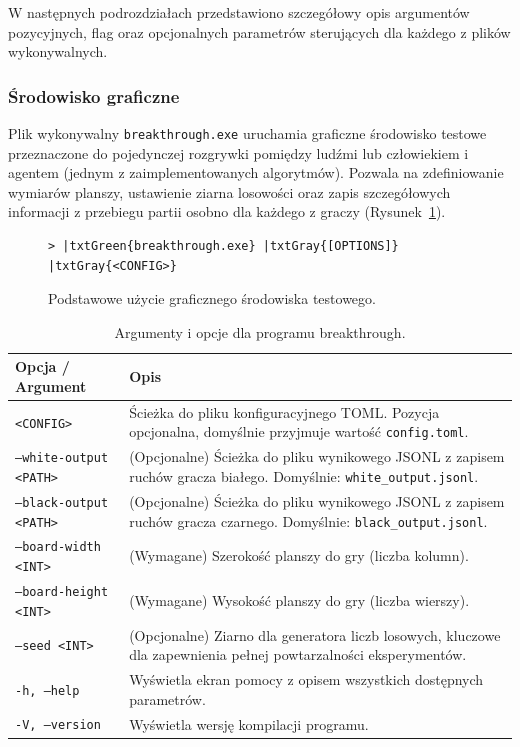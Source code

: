 \documentclass{article}
\begin{document}
W następnych podrozdziałach przedstawiono szczegółowy opis argumentów pozycyjnych, flag oraz opcjonalnych parametrów sterujących dla każdego z plików wykonywalnych.

\subsubsection{Środowisko graficzne}

Plik wykonywalny \texttt{breakthrough.exe} uruchamia graficzne środowisko testowe przeznaczone do pojedynczej rozgrywki pomiędzy ludźmi lub człowiekiem i agentem (jednym z zaimplementowanych algorytmów). Pozwala na zdefiniowanie wymiarów planszy, ustawienie ziarna losowości oraz zapis szczegółowych informacji z przebiegu partii osobno dla każdego z graczy (Rysunek~\ref{fig:breakthrough-run}).

\begin{figure}[H]
\small
\centering
\begin{Verbatim}[commandchars=\|\{\}]
> |txtGreen{breakthrough.exe} |txtGray{[OPTIONS]} |txtGray{<CONFIG>}
\end{Verbatim}
\caption{Podstawowe użycie graficznego środowiska testowego.}
\label{fig:breakthrough-run}
\end{figure}

\begin{table}[H]
    \centering
    \caption{Argumenty i opcje dla programu breakthrough.}
    \label{tab:breakthrough-args}
    \renewcommand{\arraystretch}{1.2}
    \begin{tabularx}{\textwidth}{|l|X|}
        \hline
        \textbf{Opcja / Argument} & \textbf{Opis} \\
        \hline
        \texttt{<CONFIG>} & Ścieżka do pliku konfiguracyjnego TOML. Pozycja opcjonalna, domyślnie przyjmuje wartość \texttt{config.toml}. \\
        \texttt{---white-output <PATH>} & (Opcjonalne) Ścieżka do pliku wynikowego JSONL z zapisem ruchów gracza białego. Domyślnie: \texttt{white\_output.jsonl}. \\
        \texttt{---black-output <PATH>} & (Opcjonalne) Ścieżka do pliku wynikowego JSONL z zapisem ruchów gracza czarnego. Domyślnie: \texttt{black\_output.jsonl}. \\
        \texttt{---board-width <INT>} & (Wymagane) Szerokość planszy do gry (liczba kolumn). \\
        \texttt{---board-height <INT>} & (Wymagane) Wysokość planszy do gry (liczba wierszy). \\
        \texttt{---seed <INT>} & (Opcjonalne) Ziarno dla generatora liczb losowych, kluczowe dla zapewnienia pełnej powtarzalności eksperymentów. \\
        \texttt{-h, ---help} & Wyświetla ekran pomocy z opisem wszystkich dostępnych parametrów. \\
        \texttt{-V, ---version} & Wyświetla wersję kompilacji programu. \\
        \hline
    \end{tabularx}
\end{table}
\end{document}
